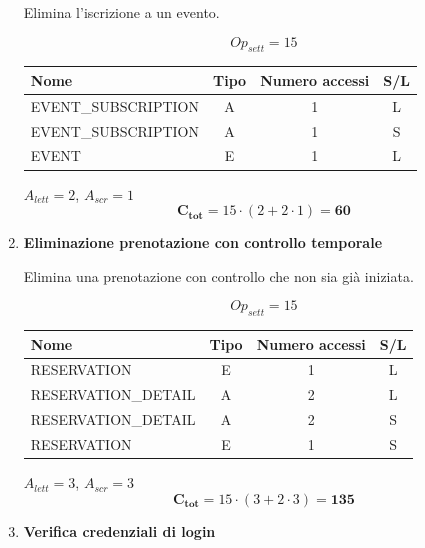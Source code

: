 \documentclass[a4paper,12pt]{report}
\begin{document}
\begin{enumerate}
    Elimina l'iscrizione a un evento.
    
    $$Op_{sett} = 15$$
    
    \begin{table}[H]
        \centering
        \small
        \renewcommand{\arraystretch}{1.15}
        \begin{tabularx}{0.8\textwidth}{|X|c|c|c|}
            \hline
            \rowcolor{gray!20}
            \textbf{Nome} & \textbf{Tipo} & \textbf{Numero accessi} & \textbf{S/L} \\
            \hline
            EVENT\_SUBSCRIPTION & A & 1 & L \\
            EVENT\_SUBSCRIPTION & A & 1 & S \\
            EVENT & E & 1 & L \\
            \hline
        \end{tabularx}
    \end{table}
    
    $A_{lett} = 2$, $A_{scr} = 1$
    $$\mathbf{C_{tot}} = 15 \cdot (2 + 2 \cdot 1) = \mathbf{60}$$

    \item {\large \textbf{Eliminazione prenotazione con controllo temporale}} \label{op18}
    
    Elimina una prenotazione con controllo che non sia già iniziata.
    
    $$Op_{sett} = 15$$
    
    \begin{table}[H]
        \centering
        \small
        \renewcommand{\arraystretch}{1.15}
        \begin{tabularx}{0.8\textwidth}{|X|c|c|c|}
            \hline
            \rowcolor{gray!20}
            \textbf{Nome} & \textbf{Tipo} & \textbf{Numero accessi} & \textbf{S/L} \\
            \hline
            RESERVATION & E & 1 & L \\
            RESERVATION\_DETAIL & A & 2 & L \\
            RESERVATION\_DETAIL & A & 2 & S \\
            RESERVATION & E & 1 & S \\
            \hline
        \end{tabularx}
    \end{table}
    
    $A_{lett} = 3$, $A_{scr} = 3$
    $$\mathbf{C_{tot}} = 15 \cdot (3 + 2 \cdot 3) = \mathbf{135}$$

    \item {\large \textbf{Verifica credenziali di login}} \label{op19}
    

\end{enumerate}
\end{document}
